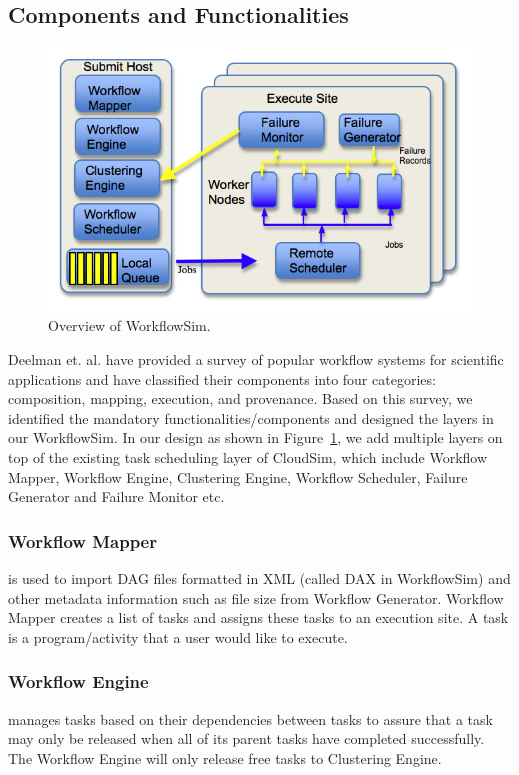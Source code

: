 \subsection{Components and Functionalities}

\begin{figure}[!htb]
	\centering
	\includegraphics[width=1.0\linewidth]{figures/workflowsim/wfs_overview.png}
	\caption{Overview of WorkflowSim.}
	\label{fig:wfs}
\end{figure}

Deelman et. al. \cite{Deelman2009} have provided a survey of popular workflow systems for scientific applications and have classified their components into four categories: composition, mapping, execution, and provenance. Based on this survey, we identified the mandatory functionalities/components and designed the layers in our WorkflowSim. In our design as shown in Figure~\ref{fig:wfs}, we add multiple layers on top of the existing task scheduling layer of CloudSim, which include Workflow Mapper, Workflow Engine, Clustering Engine, Workflow Scheduler, Failure Generator and Failure Monitor etc. 

\subsubsection{Workflow Mapper} is used to import DAG files formatted in XML (called DAX in WorkflowSim) and other metadata information such as file size from Workflow Generator. Workflow Mapper creates a list of tasks and assigns these tasks to an execution site. A task is a program/activity that a user would like to execute. 
\subsubsection{Workflow Engine} manages tasks based on their dependencies between tasks to assure that a task may only be released when all of its parent tasks have completed successfully. The Workflow Engine will only release free tasks to Clustering Engine. 
